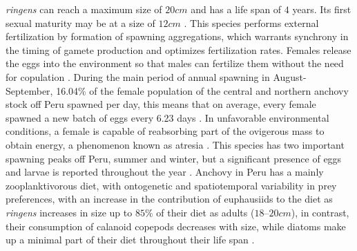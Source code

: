 \textit{\gls{ringens}} can reach a maximum size of $20cm$ and has a life span of $4$ years. Its first sexual maturity may be at a size of $12cm$ \citep{GutiSwar2007,MarzShin2009}. This species performs external fertilization by formation of spawning aggregations, which warrants synchrony in the timing of gamete production and optimizes fertilization rates. Females release the eggs into the environment so that males can fertilize them without the need for copulation \citep{Gani2014}. During the main period of annual spawning in August-September, 16.04\% of the female population of the central and northern anchovy stock off Peru spawned per day, this means that on average, every female spawned a new batch of eggs every 6.23 days \citep{AlheAlar1984,AlheAleg1983}. In unfavorable environmental conditions, a female is capable of reabsorbing part of the ovigerous mass to obtain energy, a phenomenon known as atresia \citep{PereRoqu2008,EspiVera2009,ClarCast2012,BuitPere2018}. This species has two important spawning peaks off Peru, summer and winter, but a significant presence of eggs and larvae is reported throughout the year \citep{MarzShin2009}. Anchovy in Peru has a mainly zooplanktivorous diet, with ontogenetic and spatiotemporal variability in prey preferences, with an increase in the contribution of euphausiids to the diet as \textit{\gls{ringens}} increases in size up to $85 \%$ of their diet as adults ($18 – 20 cm$), in contrast, their consumption of calanoid copepods decreases with size, while diatoms make up a minimal part of their diet throughout their life span \citep{EspiBert2008,EspiBert2014}.\\

